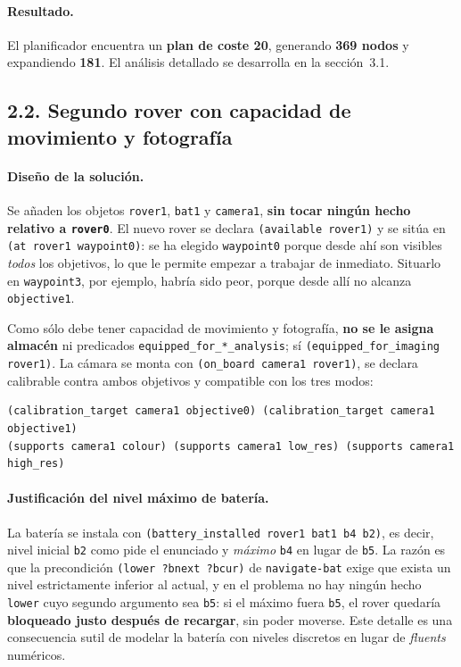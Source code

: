 \documentclass[12pt,a4paper]{article}
\begin{document}
\paragraph{Resultado.}
El planificador encuentra un \textbf{plan de coste 20}, generando
\textbf{369 nodos} y expandiendo \textbf{181}. El an\'alisis detallado se
desarrolla en la secci\'on~3.1.

\subsection{2.2. Segundo rover con capacidad de movimiento y fotograf\'ia}

\paragraph{Dise\~no de la soluci\'on.}
Se a\~naden los objetos \texttt{rover1}, \texttt{bat1} y \texttt{camera1},
\textbf{sin tocar ning\'un hecho relativo a \texttt{rover0}}. El nuevo rover
se declara \texttt{(available rover1)} y se sit\'ua en
\texttt{(at rover1 waypoint0)}: se ha elegido \texttt{waypoint0} porque desde
ah\'i son visibles \emph{todos} los objetivos, lo que le permite empezar a
trabajar de inmediato. Situarlo en \texttt{waypoint3}, por ejemplo, habr\'ia
sido peor, porque desde all\'i no alcanza \texttt{objective1}.

Como s\'olo debe tener capacidad de movimiento y fotograf\'ia,
\textbf{no se le asigna almac\'en} ni predicados
\texttt{equipped\_for\_*\_analysis}; s\'i
\texttt{(equipped\_for\_imaging rover1)}. La c\'amara se monta con
\texttt{(on\_board camera1 rover1)}, se declara calibrable contra ambos
objetivos y compatible con los tres modos:

\begin{lstlisting}
(calibration_target camera1 objective0) (calibration_target camera1 objective1)
(supports camera1 colour) (supports camera1 low_res) (supports camera1 high_res)
\end{lstlisting}

\paragraph{Justificaci\'on del nivel m\'aximo de bater\'ia.}
La bater\'ia se instala con \texttt{(battery\_installed rover1 bat1 b4 b2)},
es decir, nivel inicial \texttt{b2} como pide el enunciado y \emph{m\'aximo}
\texttt{b4} en lugar de \texttt{b5}. La raz\'on es que la precondici\'on
\texttt{(lower ?bnext ?bcur)} de \texttt{navigate-bat} exige que exista un
nivel estrictamente inferior al actual, y en el problema no hay ning\'un
hecho \texttt{lower} cuyo segundo argumento sea \texttt{b5}: si el m\'aximo
fuera \texttt{b5}, el rover quedar\'ia \textbf{bloqueado justo despu\'es de
recargar}, sin poder moverse. Este detalle es una consecuencia sutil de
modelar la bater\'ia con niveles discretos en lugar de \emph{fluents}
num\'ericos.
\end{document}

